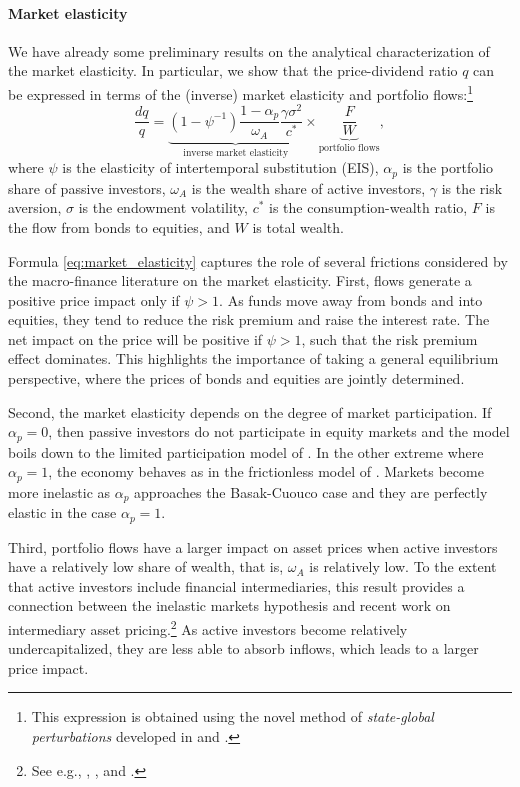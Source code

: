 \paragraph{Market elasticity} We have already some preliminary results on the analytical characterization of the market elasticity. 
In particular, we show that the price-dividend ratio $q$ can be expressed in terms of the (inverse) market elasticity and portfolio flows:\footnote{This expression is obtained using the novel method of \textit{state-global perturbations} developed in \citet{silva2019risk} and \citet{kargar2020competitive}.}    
\begin{equation}\label{eq:market_elasticity}
    \frac{d q}{q} = \underbrace{(1-\psi^{-1}) \frac{1-\alpha_p}{\omega_A} \frac{\gamma \sigma^2}{c^*}}_{\text{inverse market elasticity}} \times \underbrace{ \frac{F}{W}}_{\text{portfolio flows}}, 
\end{equation}
where $\psi$ is the elasticity of intertemporal substitution (EIS), $\alpha_p$ is the portfolio share of passive investors, $\omega_A$ is the wealth share of active investors, $\gamma$ is the risk aversion, $\sigma$ is the endowment volatility, $c^*$  is the consumption-wealth ratio, $F$ is the flow from bonds to equities, and $W$ is total wealth. 

Formula \eqref{eq:market_elasticity} captures the role of several frictions considered by the macro-finance literature on the market elasticity. 
First, flows generate a positive price impact only if $\psi > 1$.
As funds move away from bonds and into equities, they tend to reduce the risk premium and raise the interest rate. 
The net impact on the price will be positive if $\psi > 1$, such that the risk premium effect dominates. 
This highlights the importance of taking a general equilibrium perspective, where the prices of bonds and equities are jointly determined. 

Second, the market elasticity depends on the degree of market participation. 
If $\alpha_p = 0$, then passive investors do not participate in equity markets and the model boils down to the limited participation model of \citet{basak1998equilibrium}. 
In the other extreme where $\alpha_p = 1$, the economy behaves as in the frictionless model of \citet{lucas1978asset}. 
Markets become more inelastic as $\alpha_p$ approaches the Basak-Cuouco case and they are perfectly elastic in the case $\alpha_p = 1$.

Third, portfolio flows have a larger impact on asset prices when active investors have a relatively low share of wealth, that is, $\omega_A$ is relatively low.
To the extent that active investors include financial intermediaries, this result provides a connection between the inelastic markets hypothesis and recent work on  intermediary asset pricing.\footnote{See e.g., \citet{he2013intermediary}, \citet{he2017intermediary}, and \citet{adrian2014financial}.} 
As active investors become relatively undercapitalized, they are less able to absorb inflows, which leads to a larger price impact. 

